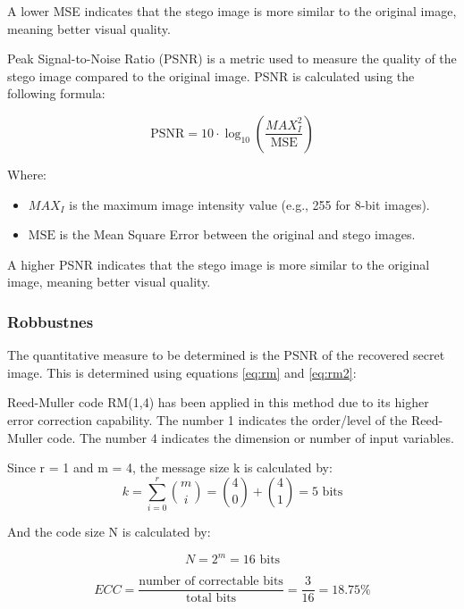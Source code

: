 \documentclass{ittelkom}
\begin{document}
A lower MSE indicates that the stego image is more similar to the original
image, meaning better visual quality.

Peak Signal-to-Noise Ratio (PSNR) is a metric used to measure the quality of
the stego image compared to the original image. PSNR is calculated using the
following formula:

\begin{equation}
    \text{PSNR} = 10 \cdot \log_{10} \left( \frac{MAX_I^2}{\text{MSE}} \right)
\end{equation}

Where:
\begin{itemize}
    \item $MAX_I$ is the maximum image intensity value (e.g., 255 for 8-bit images).
    \item $\text{MSE}$ is the Mean Square Error between the original and stego images.
\end{itemize}

A higher PSNR indicates that the stego image is more similar to the original
image, meaning better visual quality.

\subsubsection{Robbustnes}

The quantitative measure to be determined is the PSNR of the recovered secret
image. This is determined using equations \ref{eq:rm} and \ref{eq:rm2}:

Reed-Muller code RM(1,4) has been applied in this method due to its higher
error correction capability. The number 1 indicates the order/level of the
Reed-Muller code. The number 4 indicates the dimension or number of input
variables.

Since r = 1 and m = 4, the message size k is calculated by:
\begin{equation}
    k = \sum_{i=0}^{r} \binom{m}{i} = \binom{4}{0} + \binom{4}{1} = 5 \text{ bits}
    \label{eq:rm}
\end{equation}

And the code size N is calculated by:

\begin{equation}
    N = 2^m = 16 \text{ bits}
    \label{eq:rm2}
\end{equation}

\begin{equation}
    ECC = \frac{\text{number of correctable bits}}{\text{total bits}} = \frac{3}{16} = 18.75\%
\end{equation}
\end{document}
